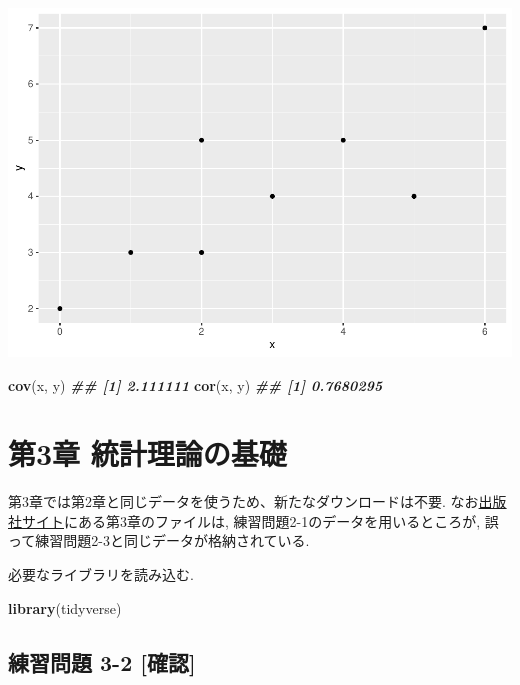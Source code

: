 \documentclass[
]{book}
\newenvironment{Shaded}{\begin{snugshade}}{\end{snugshade}}
\newcommand{\DocumentationTok}[1]{\textcolor[rgb]{0.56,0.35,0.01}{\textbf{\textit{#1}}}}
\newcommand{\FunctionTok}[1]{\textcolor[rgb]{0.13,0.29,0.53}{\textbf{#1}}}
\newcommand{\NormalTok}[1]{#1}
\begin{document}
\includegraphics{_main_files/figure-latex/unnamed-chunk-6-1.pdf}

\begin{Shaded}
\begin{Highlighting}[]

\FunctionTok{cov}\NormalTok{(x, y)}
\DocumentationTok{\#\# [1] 2.111111}
\FunctionTok{cor}\NormalTok{(x, y)}
\DocumentationTok{\#\# [1] 0.7680295}
\end{Highlighting}
\end{Shaded}

\hypertarget{ch3}{%
\chapter*{第3章 統計理論の基礎}\label{ch3}}

第3章では第2章と同じデータを使うため、新たなダウンロードは不要.
なお\href{https://www.yuhikaku.co.jp/books/detail/9784641053854}{出版社サイト}にある第3章のファイルは, 練習問題2-1のデータを用いるところが, 誤って練習問題2-3と同じデータが格納されている.

必要なライブラリを読み込む.

\begin{Shaded}
\begin{Highlighting}[]
\FunctionTok{library}\NormalTok{(tidyverse)}
\end{Highlighting}
\end{Shaded}

\hypertarget{ux7df4ux7fd2ux554fux984c-3-2-ux78baux8a8d}{%
\section*{練習問題 3-2 {[}確認{]}}\label{ux7df4ux7fd2ux554fux984c-3-2-ux78baux8a8d}}
\end{document}
